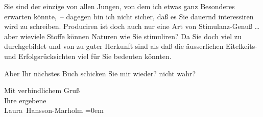 \pstart
           Sie sind der einzige von allen Jungen, von dem ich etwas ganz Besonderes erwarten
               könnte, – dagegen bin ich nicht sicher, daß es Sie dauernd interessiren wird zu
               schreiben. Produciren ist doch auch nur eine Art von Stimulanz-Genuß {\dots} aber wieviele Stoffe können Naturen wie Sie stimuliren?
               Da Sie doch viel zu durchgebildet und von zu guter Herkunft sind als daß die
               äusserlichen Eitelkeits- und Erfolgsrücksichten viel für Sie bedeuten könnten.\pend
           
\pstart
           Aber Ihr nächstes Buch schicken Sie mir wieder? nicht wahr?\pend
           
\pstart
           Mit verbindlichem Gruß{\\[\baselineskip]} Ihre ergebene{\\[\baselineskip]}\spacefill\mbox{Laura Hansson-Marholm}\pend
           \leftskip=0em{}\endnumbering{}  \newcommand{\dateiname}{L00431}\newcommand{\titel}{Laura Marholm an Arthur Schnitzler, 24. 4. 1895}\newcommand{\editorInnen}{Martin Anton Müller und Gerd-Hermann Susen}
